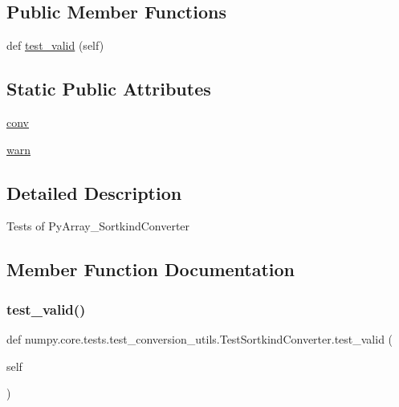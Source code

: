 \subsection*{Public Member Functions}
\begin{DoxyCompactItemize}
\item 
def \hyperlink{classnumpy_1_1core_1_1tests_1_1test__conversion__utils_1_1TestSortkindConverter_a0ce481adad0e0dd6f28809fe27a7e42a}{test\+\_\+valid} (self)
\end{DoxyCompactItemize}
\subsection*{Static Public Attributes}
\begin{DoxyCompactItemize}
\item 
\hyperlink{classnumpy_1_1core_1_1tests_1_1test__conversion__utils_1_1TestSortkindConverter_a58a1fb2d9e102b36eb384c42d37db384}{conv}
\item 
\hyperlink{classnumpy_1_1core_1_1tests_1_1test__conversion__utils_1_1TestSortkindConverter_ad3b43c13961fa1e194fb7b43ab5dc58b}{warn}
\end{DoxyCompactItemize}


\subsection{Detailed Description}
\begin{DoxyVerb}Tests of PyArray_SortkindConverter \end{DoxyVerb}
 

\subsection{Member Function Documentation}
\mbox{\label{classnumpy_1_1core_1_1tests_1_1test__conversion__utils_1_1TestSortkindConverter_a0ce481adad0e0dd6f28809fe27a7e42a}} 
\subsubsection{\texorpdfstring{test\+\_\+valid()}{test\_valid()}}
{\footnotesize\ttfamily def numpy.\+core.\+tests.\+test\+\_\+conversion\+\_\+utils.\+Test\+Sortkind\+Converter.\+test\+\_\+valid (\begin{DoxyParamCaption}\item[{}]{self }\end{DoxyParamCaption})}



